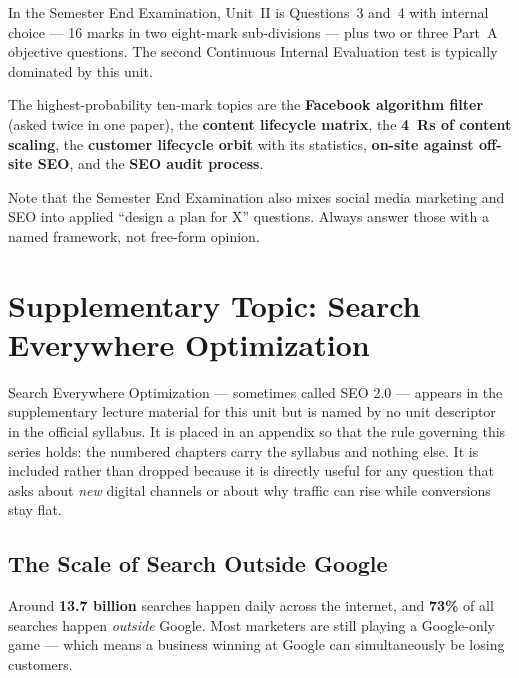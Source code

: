 \begin{keybox}
In the Semester End Examination, Unit~II is Questions~3 and~4 with internal
choice --- 16 marks in two eight-mark sub-divisions --- plus two or three Part~A
objective questions. The second Continuous Internal Evaluation test is typically
dominated by this unit.

\smallskip
The highest-probability ten-mark topics are the \textbf{Facebook algorithm
filter} (asked twice in one paper), the \textbf{content lifecycle matrix}, the
\textbf{4~Rs of content scaling}, the \textbf{customer lifecycle orbit} with its
statistics, \textbf{on-site against off-site SEO}, and the \textbf{SEO audit
process}.

\smallskip
Note that the Semester End Examination also mixes social media marketing and SEO
into applied ``design a plan for X'' questions. Always answer those with a named
framework, not free-form opinion.
\end{keybox}

\chapter{Supplementary Topic: Search Everywhere Optimization}

\begin{warnbox}
Search Everywhere Optimization --- sometimes called SEO 2.0 --- appears in the
supplementary lecture material for this unit but is named by no unit descriptor
in the official syllabus. It is placed in an appendix so that the rule governing
this series holds: the numbered chapters carry the syllabus and nothing else. It
is included rather than dropped because it is directly useful for any question
that asks about \emph{new} digital channels or about why traffic can rise while
conversions stay flat.
\end{warnbox}

\section{The Scale of Search Outside Google}

\begin{keybox}
Around \textbf{13.7 billion} searches happen daily across the internet, and
\textbf{73\%} of all searches happen \emph{outside} Google. Most marketers are
still playing a Google-only game --- which means a business winning at Google can
simultaneously be losing customers.
\end{keybox}

